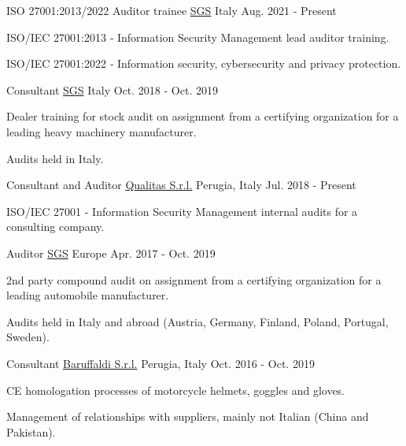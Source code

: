 \begin{cventries}
\cventry
{ISO 27001:2013/2022 Auditor trainee}
{\href{https://sgs.com}{SGS}}
{Italy}
{Aug. 2021 - Present}
{\begin{cvitems}
\item {ISO/IEC 27001:2013 ‑ Information Security Management lead auditor training.}
\item {ISO/IEC 27001:2022 ‑ Information security, cybersecurity and privacy protection.}
\end{cvitems}}

\cventry
{Consultant}
{\href{https://sgs.com}{SGS}}
{Italy}
{Oct. 2018 - Oct. 2019}
{\begin{cvitems}
\item {Dealer training for stock audit on assignment from a certifying organization for a leading heavy machinery manufacturer.}
\item {Audits held in Italy.}
\end{cvitems}}

\cventry
{Consultant and Auditor}
{\href{https://www.qualitas.eu}{Qualitas S.r.l.}}
{Perugia, Italy}
{Jul. 2018 - Present}
{\begin{cvitems}
\item {ISO/IEC 27001 - Information Security Management internal audits for a consulting company.}
\end{cvitems}}

\cventry
{Auditor}
{\href{https://sgs.com}{SGS}}
{Europe}
{Apr. 2017 - Oct. 2019}
{\begin{cvitems}
\item {2nd party compound audit on assignment from a certifying organization for a leading automobile manufacturer.}
\item {Audits held in Italy and abroad (Austria, Germany, Finland, Poland, Portugal, Sweden).}
\end{cvitems}}

\cventry
{Consultant}
{\href{https://www.baruffaldi.net/}{Baruffaldi S.r.l.}}
{Perugia, Italy}
{Oct. 2016 - Oct. 2019}
{\begin{cvitems}
\item {CE homologation processes of motorcycle helmets, goggles and gloves.}
\item {Management of relationships with suppliers, mainly not Italian (China and Pakistan).}
\end{cvitems}}

\end{cventries}